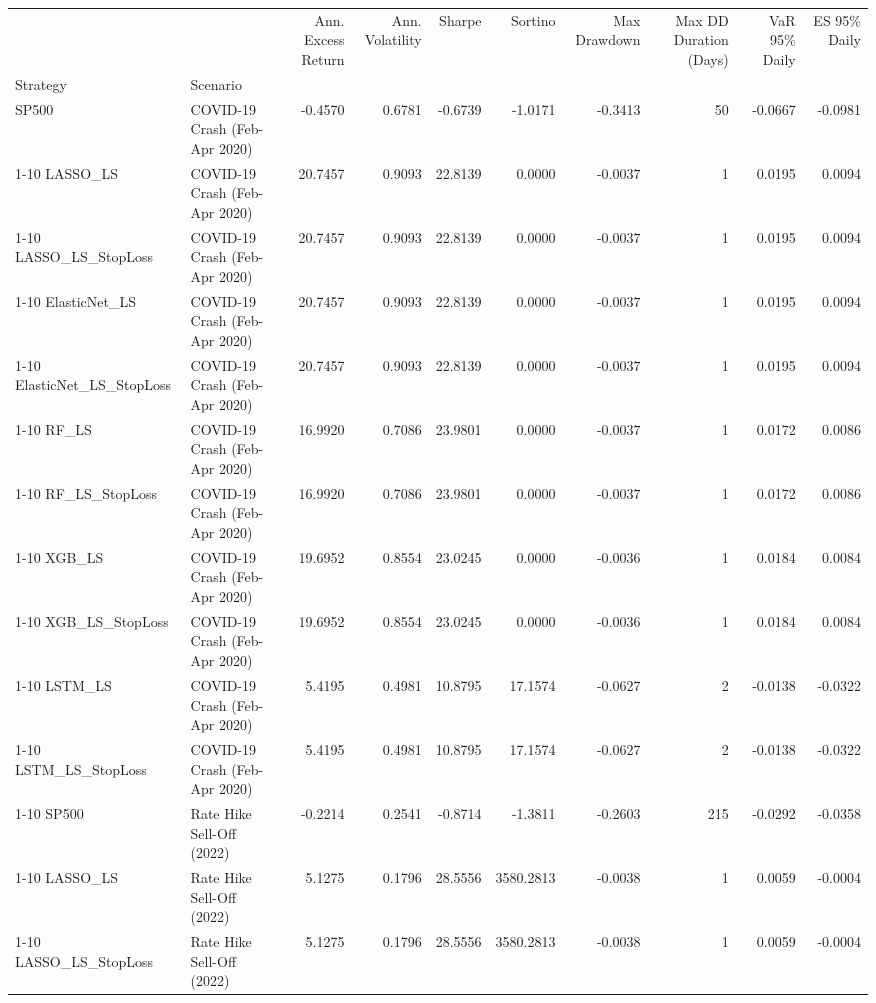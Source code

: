 \begin{tabular}{llrrrrrrrr}
\toprule
 &  & Ann. Excess Return & Ann. Volatility & Sharpe & Sortino & Max Drawdown & Max DD Duration (Days) & VaR 95\% Daily & ES 95\% Daily \\
Strategy & Scenario &  &  &  &  &  &  &  &  \\
\midrule
SP500 & COVID-19 Crash (Feb-Apr 2020) & -0.4570 & 0.6781 & -0.6739 & -1.0171 & -0.3413 & 50 & -0.0667 & -0.0981 \\
\cline{1-10}
LASSO\_LS & COVID-19 Crash (Feb-Apr 2020) & 20.7457 & 0.9093 & 22.8139 & 0.0000 & -0.0037 & 1 & 0.0195 & 0.0094 \\
\cline{1-10}
LASSO\_LS\_StopLoss & COVID-19 Crash (Feb-Apr 2020) & 20.7457 & 0.9093 & 22.8139 & 0.0000 & -0.0037 & 1 & 0.0195 & 0.0094 \\
\cline{1-10}
ElasticNet\_LS & COVID-19 Crash (Feb-Apr 2020) & 20.7457 & 0.9093 & 22.8139 & 0.0000 & -0.0037 & 1 & 0.0195 & 0.0094 \\
\cline{1-10}
ElasticNet\_LS\_StopLoss & COVID-19 Crash (Feb-Apr 2020) & 20.7457 & 0.9093 & 22.8139 & 0.0000 & -0.0037 & 1 & 0.0195 & 0.0094 \\
\cline{1-10}
RF\_LS & COVID-19 Crash (Feb-Apr 2020) & 16.9920 & 0.7086 & 23.9801 & 0.0000 & -0.0037 & 1 & 0.0172 & 0.0086 \\
\cline{1-10}
RF\_LS\_StopLoss & COVID-19 Crash (Feb-Apr 2020) & 16.9920 & 0.7086 & 23.9801 & 0.0000 & -0.0037 & 1 & 0.0172 & 0.0086 \\
\cline{1-10}
XGB\_LS & COVID-19 Crash (Feb-Apr 2020) & 19.6952 & 0.8554 & 23.0245 & 0.0000 & -0.0036 & 1 & 0.0184 & 0.0084 \\
\cline{1-10}
XGB\_LS\_StopLoss & COVID-19 Crash (Feb-Apr 2020) & 19.6952 & 0.8554 & 23.0245 & 0.0000 & -0.0036 & 1 & 0.0184 & 0.0084 \\
\cline{1-10}
LSTM\_LS & COVID-19 Crash (Feb-Apr 2020) & 5.4195 & 0.4981 & 10.8795 & 17.1574 & -0.0627 & 2 & -0.0138 & -0.0322 \\
\cline{1-10}
LSTM\_LS\_StopLoss & COVID-19 Crash (Feb-Apr 2020) & 5.4195 & 0.4981 & 10.8795 & 17.1574 & -0.0627 & 2 & -0.0138 & -0.0322 \\
\cline{1-10}
SP500 & Rate Hike Sell-Off (2022) & -0.2214 & 0.2541 & -0.8714 & -1.3811 & -0.2603 & 215 & -0.0292 & -0.0358 \\
\cline{1-10}
LASSO\_LS & Rate Hike Sell-Off (2022) & 5.1275 & 0.1796 & 28.5556 & 3580.2813 & -0.0038 & 1 & 0.0059 & -0.0004 \\
\cline{1-10}
LASSO\_LS\_StopLoss & Rate Hike Sell-Off (2022) & 5.1275 & 0.1796 & 28.5556 & 3580.2813 & -0.0038 & 1 & 0.0059 & -0.0004 \\

\end{tabular}
